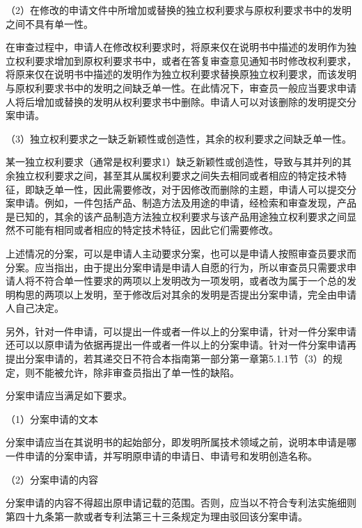 {\setlength{\parindent}{17.1bp}（2）在修改的申请文件中所增加或替换的独立权利要求与原权利要求书中的发明之间不具有单一性。\par}

在审查过程中，申请人在修改权利要求时，将原来仅在说明书中描述的发明作为独立权利要求增加到原权利要求书中，或者在答复审查意见通知书时修改权利要求，将原来仅在说明书中描述的发明作为独立权利要求替换原独立权利要求，而该发明与原权利要求书中的发明之间缺乏单一性。在此情况下，审查员一般应当要求申请人将后增加或替换的发明从权利要求书中删除。申请人可以对该删除的发明提交分案申请。

{\setlength{\parindent}{17.1bp}（3）独立权利要求之一缺乏新颖性或创造性，其余的权利要求之间缺乏单一性。\par}

某一独立权利要求（通常是权利要求1）缺乏新颖性或创造性，导致与其并列的其余独立权利要求之间，甚至其从属权利要求之间失去相同或者相应的特定技术特征，即缺乏单一性，因此需要修改，对于因修改而删除的主题，申请人可以提交分案申请。例如，一件包括产品、制造方法及用途的申请，经检索和审查发现，产品是已知的，其余的该产品制造方法独立权利要求与该产品用途独立权利要求之间显然不可能有相同或者相应的特定技术特征，因此它们需要修改。

上述情况的分案，可以是申请人主动要求分案，也可以是申请人按照审查员要求而分案。应当指出，由于提出分案申请是申请人自愿的行为，所以审查员只需要求申请人将不符合单一性要求的两项以上发明改为一项发明，或者改为属于一个总的发明构思的两项以上发明，至于修改后对其余的发明是否提出分案申请，完全由申请人自己决定。

另外，针对一件申请，可以提出一件或者一件以上的分案申请，针对一件分案申请还可以以原申请为依据再提出一件或者一件以上的分案申请。针对一件分案申请再提出分案申请的，若其递交日不符合本指南第一部分第一章第5.1.1节（3）的规定，则不能被允许，除非审查员指出了单一性的缺陷。

分案申请应当满足如下要求。

{\setlength{\parindent}{17.1bp}（1）分案申请的文本\par}

分案申请应当在其说明书的起始部分，即发明所属技术领域之前，说明本申请是哪一件申请的分案申请，并写明原申请的申请日、申请号和发明创造名称。

{\setlength{\parindent}{17.1bp}（2）分案申请的内容\par}

分案申请的内容不得超出原申请记载的范围。否则，应当以不符合专利法实施细则第四十九条第一款或者专利法第三十三条规定为理由驳回该分案申请。

